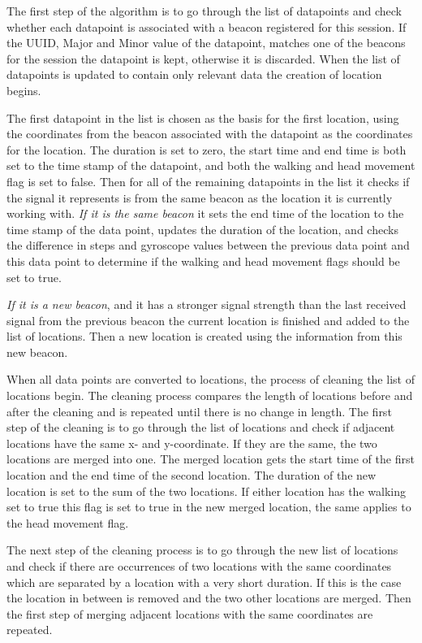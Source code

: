 \documentclass[../Main/thesis.tex]{subfiles}
\begin{document}
The first step of the algorithm is to go through the list of datapoints and check whether each datapoint is associated with a beacon registered for this session.
If the UUID, Major and Minor value of the datapoint, matches one of the beacons for the session the datapoint is kept, otherwise it is discarded.
When the list of datapoints is updated to contain only relevant data the creation of location begins.

The first datapoint in the list is chosen as the basis for the first location, using the coordinates from the beacon associated with the datapoint as the coordinates for the location.
The duration is set to zero, the start time and end time is both set to the time stamp of the datapoint, and both the walking and head movement flag is set to false.
Then for all of the remaining datapoints in the list it checks if the signal it represents is from the same beacon as the location it is currently working with.
\textit{If it is the same beacon} it sets the end time of the location to the time stamp of the data point, updates the duration of the location, and checks the difference in steps and gyroscope values between the previous data point and this data point to determine if the walking and head movement flags should be set to true.

\textit{If it is a new beacon}, and it has a stronger signal strength than the last received signal from the previous beacon the current location is finished and added to the list of locations.
Then a new location is created using the information from this new beacon.

When all data points are converted to locations, the process of cleaning the list of locations begin.
The cleaning process compares the length of locations before and after the cleaning and is repeated until there is no change in length.
The first step of the cleaning is to go through the list of locations and check if adjacent locations have the same x- and y-coordinate.
If they are the same, the two locations are merged into one.
The merged location gets the start time of the first location and the end time of the second location.
The duration of the new location is set to the sum of the two locations.
If either location has the walking set to true this flag is set to true in the new merged location, the same applies to the head movement flag.

The next step of the cleaning process is to go through the new list of locations and check if there are occurrences of two locations with the same coordinates which are separated by a location with a very short duration.
If this is the case the location in between is removed and the two other locations are merged.
Then the first step of merging adjacent locations with the same coordinates are repeated.
\end{document}

